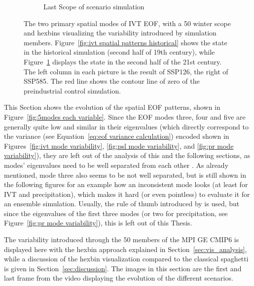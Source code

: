 \begin{figure}[!htb]
\begin{subfigure}[b]{0.49\textwidth}
    \caption{Last Scope of scenario simulation}
    \label{fig:ivt spatial patterns endscenario}
  \end{subfigure}
  \caption{The two primary spatial modes of IVT EOF, with a 50 winter scope and hexbins visualizing the variability introduced by simulation members. Figure~\ref{fig:ivt spatial patterns historical} shows the state in the historical simulation (second half of 19th century), while Figure~\ref{fig:ivt spatial patterns endscenario} displays the state in the second half of the 21st century. The left column in each picture is the result of SSP126, the right of SSP585. The red line shows the contour line of zero of the preindustrial control simulation. }\label{fig:ivt eof evolution}
\end{figure}

This Section shows the evolution of the spatial EOF patterns, shown in Figure~\ref{fig:5modes each variable}. 
Since the EOF modes three, four and five are generally quite low and similar in their eigenvalues (which directly correspond to the variance (see Equation~\ref{eq:eof variance calculation}) encoded shown in Figures~\ref{fig:ivt mode variability}, \ref{fig:psl mode variability}, and \ref{fig:pr mode variability}), they are left out of the analysis of this and the following sections, as modes' eigenvalues need to be well separated from each other \cite{hannachi_empirical_2007}. 
As already mentioned, mode three also seems to be not well separated, but is still shown in the following figures for an example how an inconsistent mode looks (at least for IVT and precipitation), which makes it hard (or even pointless) to evaluate it for an ensemble simulation.  
Usually, the rule of thumb introduced by  is used, but since the eigenvalues of the first three modes (or two for precipitation, see Figure~\ref{fig:pr mode variability}), this is left out of this Thesis. 

The variability introduced through the 50 members of the MPI GE CMIP6 is displayed here with the hexbin approach explained in Section~\ref{sec:vis_analysis}, while a discussion of the hexbin visualization compared to the classical spaghetti is given in Section~\ref{sec:discussion}.
The images in this section are the first and last frame from the video displaying the evolution of the different scenarios.  


